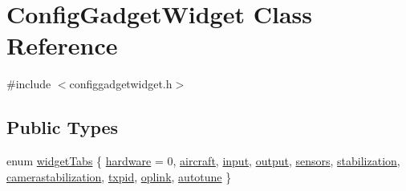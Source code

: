 \hypertarget{class_config_gadget_widget}{\section{\-Config\-Gadget\-Widget \-Class \-Reference}
\label{class_config_gadget_widget}
}


{\ttfamily \#include $<$configgadgetwidget.\-h$>$}

\subsection*{\-Public \-Types}
\begin{DoxyCompactItemize}
\item 
enum \hyperlink{group___config_plugin_ga63fe84e8399ffe3db8ffa9c83b109c66}{widget\-Tabs} \{ \*
\hyperlink{group___config_plugin_gga63fe84e8399ffe3db8ffa9c83b109c66a5d6b5e9de62beaabf98d3f3d4898bd37}{hardware} = 0, 
\hyperlink{group___config_plugin_gga63fe84e8399ffe3db8ffa9c83b109c66a0daadf1249382ad3b13cd539bcafc8a5}{aircraft}, 
\hyperlink{group___config_plugin_gga63fe84e8399ffe3db8ffa9c83b109c66a0c4c2ed85d2c3d9acd90fbd2392f10aa}{input}, 
\hyperlink{group___config_plugin_gga63fe84e8399ffe3db8ffa9c83b109c66ab940a2bf8cfb52030d1b1d7c0cddb5b2}{output}, 
\*
\hyperlink{group___config_plugin_gga63fe84e8399ffe3db8ffa9c83b109c66a9f0c06e93c63493f41060eb823cc2448}{sensors}, 
\hyperlink{group___config_plugin_gga63fe84e8399ffe3db8ffa9c83b109c66a4544ce691818bcec4988f0a3e5055b40}{stabilization}, 
\hyperlink{group___config_plugin_gga63fe84e8399ffe3db8ffa9c83b109c66afb489ec55c65ac005cbe0319bab20e11}{camerastabilization}, 
\hyperlink{group___config_plugin_gga63fe84e8399ffe3db8ffa9c83b109c66a0926ebfc1e048a25fbe8816714dcb0c8}{txpid}, 
\*
\hyperlink{group___config_plugin_gga63fe84e8399ffe3db8ffa9c83b109c66a316bc45a7cc6c902ea6b24978bb7648f}{oplink}, 
\hyperlink{group___config_plugin_gga63fe84e8399ffe3db8ffa9c83b109c66a446519617d79946d8c73fedbaf8b4e60}{autotune}
 \}
\end{DoxyCompactItemize}
